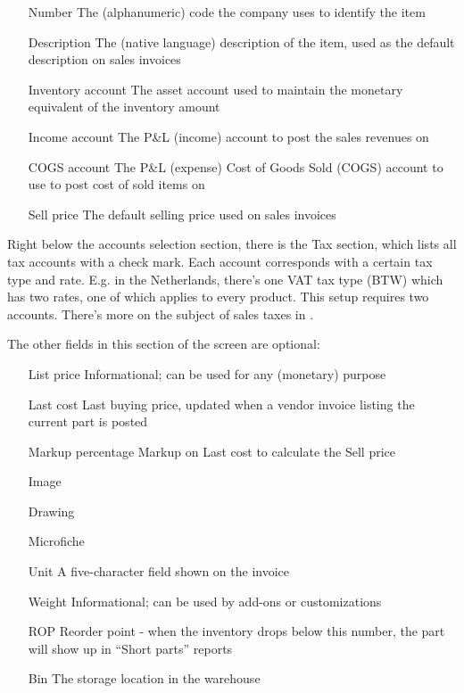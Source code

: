 \begin{itemize}
\item [Number] The (alphanumeric) code the company uses to identify the item
\item [Description] The (native language) description of the item, used as the default
	description on sales invoices
\item [Inventory account] The asset account used to maintain the monetary equivalent
	of the inventory amount
\item [Income account] The P\&L (income) account to post the sales revenues on
\item [COGS account] The P\&L (expense) Cost of Goods Sold (COGS) account to use
	to post cost of sold items on
\item [Sell price] The default selling price used on sales invoices
\end{itemize}

Right below the accounts selection section, there is the Tax section, which lists
all tax accounts with a check mark. Each account corresponds with a certain tax type
and rate. E.g. in the Netherlands, there's one VAT tax type (BTW) which has two rates,
one of which applies to every product. This setup requires two accounts. There's more
on the subject of sales taxes in .

The other fields in this section of the screen are optional:

\begin{itemize}
\item [List price] Informational; can be used for any (monetary) purpose
\item [Last cost] Last buying price, updated when a vendor invoice listing the current part
    is posted
\item [Markup percentage] Markup on Last cost to calculate the Sell price
\item [Image]
\item [Drawing]
\item [Microfiche]
\item [Unit] A five-character field shown on the invoice
\item [Weight] Informational; can be used by add-ons or customizations
\item [ROP] Reorder point - when the inventory drops below this number,
     the part will show up in ``Short parts'' reports
\item [Bin] The storage location in the warehouse
\end{itemize}


